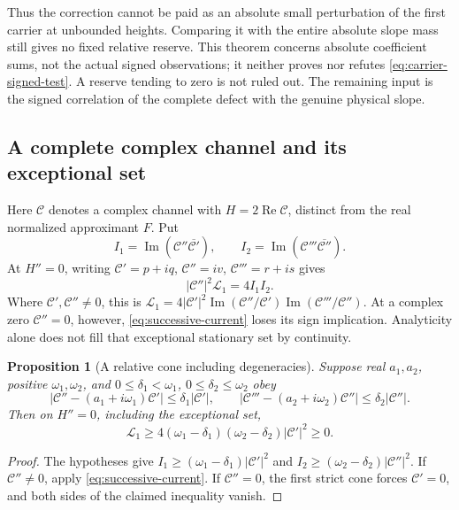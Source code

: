 \documentclass[11pt]{article}
\newtheorem{proposition}[theorem]{Proposition}
\theoremstyle{definition}
\theoremstyle{remark}
\newcommand{\Rea}{\operatorname{Re}}
\newcommand{\Ima}{\operatorname{Im}}
\begin{document}
Thus the correction cannot be paid as an absolute small perturbation of
the first carrier at unbounded heights. Comparing it with the entire
absolute slope mass still gives no fixed relative reserve. This theorem
concerns absolute coefficient sums, not the actual signed observations;
it neither proves nor refutes \eqref{eq:carrier-signed-test}. A reserve
tending to zero is not ruled out. The remaining input is the signed
correlation of the complete defect with the genuine physical slope.

\subsection{A complete complex channel and its exceptional set}

Here $\mathcal C$ denotes a complex channel with $H=2\Rea\mathcal C$,
distinct from the real normalized approximant $F$. Put
\[
 I_1=\Ima(\mathcal C''\overline{\mathcal C'}),\qquad
 I_2=\Ima(\mathcal C'''\overline{\mathcal C''}).
\]
At $H''=0$, writing $\mathcal C'=p+iq$,
$\mathcal C''=iv$, $\mathcal C'''=r+is$ gives
\begin{equation}
 |\mathcal C''|^2\mathscr L_1=4I_1I_2.
 \label{eq:successive-current}
\end{equation}
Where $\mathcal C',\mathcal C''\ne0$, this is
$\mathscr L_1=4|\mathcal C'|^2
\Ima(\mathcal C''/\mathcal C')\Ima(\mathcal C'''/\mathcal C'')$.
At a complex zero $\mathcal C''=0$, however,
\eqref{eq:successive-current} loses its sign implication. Analyticity
alone does not fill that exceptional stationary set by continuity.

\begin{proposition}[A relative cone including degeneracies]
\label{prop:relative-cone}
Suppose real $a_1,a_2$, positive $\omega_1,\omega_2$, and
$0\le\delta_1<\omega_1$, $0\le\delta_2\le\omega_2$ obey
\[
 |\mathcal C''-(a_1+i\omega_1)\mathcal C'|
       \le\delta_1|\mathcal C'|,\qquad
 |\mathcal C'''-(a_2+i\omega_2)\mathcal C''|
       \le\delta_2|\mathcal C''|.
\]
Then on $H''=0$, including the exceptional set,
\[
 \mathscr L_1\ge
 4(\omega_1-\delta_1)(\omega_2-\delta_2)|\mathcal C'|^2\ge0.
\]
\end{proposition}
\begin{proof}
The hypotheses give
$I_1\ge(\omega_1-\delta_1)|\mathcal C'|^2$ and
$I_2\ge(\omega_2-\delta_2)|\mathcal C''|^2$.
If $\mathcal C''\ne0$, apply \eqref{eq:successive-current}.
If $\mathcal C''=0$, the first strict cone forces
$\mathcal C'=0$, and both sides of the claimed inequality vanish.
\end{proof}
\end{document}
